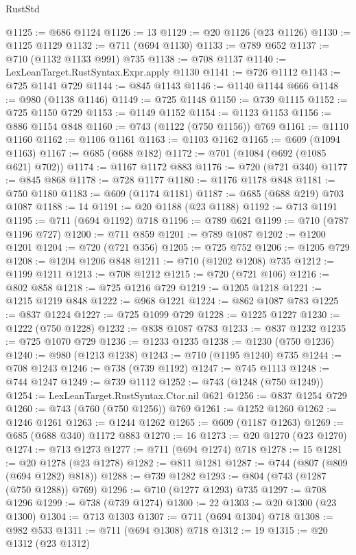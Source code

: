 \begin{lexlean}{RustStd}
\begin{coremodule}
@1125 := @686 @1124
@1126 := 13
@1129 := @20 @1126 (@23 @1126)
@1130 := @1125 @1129
@1132 := @711 (@694 @1130)
@1133 := @789 @652
@1137 := @710 (@1132 @1133 @991) @735
@1138 := @708 @1137
@1140 := LexLeanTarget.RustSyntax.Expr.apply @1130
@1141 := @726 @1112
@1143 := @725 @1141 @729
@1144 := @845 @1143
@1146 := @1140 @1144 @666
@1148 := @980 (@1138 @1146)
@1149 := @725 @1148
@1150 := @739 @1115
@1152 := @725 @1150 @729
@1153 := @1149 @1152
@1154 := @1123 @1153
@1156 := @886 @1154 @848
@1160 := @743 (@1122 (@750 @1156)) @769
@1161 := @1110 @1160
@1162 := @1106 @1161
@1163 := @1103 @1162
@1165 := @609 (@1094 @1163)
@1167 := @685 (@688 @182)
@1172 := @701 (@1084 (@692 (@1085 @621) @702))
@1174 := @1167 @1172 @883
@1176 := @720 (@721 @340)
@1177 := @845 @868
@1178 := @728 @1177
@1180 := @1176 @1178 @848
@1181 := @750 @1180
@1183 := @609 (@1174 @1181)
@1187 := @685 (@688 @219) @703 @1087
@1188 := 14
@1191 := @20 @1188 (@23 @1188)
@1192 := @713 @1191
@1195 := @711 (@694 @1192) @718
@1196 := @789 @621
@1199 := @710 (@787 @1196 @727)
@1200 := @711 @859
@1201 := @789 @1087
@1202 := @1200 @1201
@1204 := @720 (@721 @356)
@1205 := @725 @752
@1206 := @1205 @729
@1208 := @1204 @1206 @848
@1211 := @710 (@1202 @1208) @735
@1212 := @1199 @1211
@1213 := @708 @1212
@1215 := @720 (@721 @106)
@1216 := @802 @858
@1218 := @725 @1216 @729
@1219 := @1205 @1218
@1221 := @1215 @1219 @848
@1222 := @968 @1221
@1224 := @862 @1087 @783
@1225 := @837 @1224
@1227 := @725 @1099 @729
@1228 := @1225 @1227
@1230 := @1222 (@750 @1228)
@1232 := @838 @1087 @783
@1233 := @837 @1232
@1235 := @725 @1070 @729
@1236 := @1233 @1235
@1238 := @1230 (@750 @1236)
@1240 := @980 (@1213 @1238)
@1243 := @710 (@1195 @1240) @735
@1244 := @708 @1243
@1246 := @738 (@739 @1192)
@1247 := @745 @1113
@1248 := @744 @1247
@1249 := @739 @1112
@1252 := @743 (@1248 (@750 @1249))
@1254 := LexLeanTarget.RustSyntax.Ctor.nil @621
@1256 := @837 @1254 @729
@1260 := @743 (@760 (@750 @1256)) @769
@1261 := @1252 @1260
@1262 := @1246 @1261
@1263 := @1244 @1262
@1265 := @609 (@1187 @1263)
@1269 := @685 (@688 @340) @1172 @883
@1270 := 16
@1273 := @20 @1270 (@23 @1270)
@1274 := @713 @1273
@1277 := @711 (@694 @1274) @718
@1278 := 15
@1281 := @20 @1278 (@23 @1278)
@1282 := @811 @1281
@1287 := @744 (@807 (@809 (@694 @1282) @818))
@1288 := @739 @1282
@1293 := @804 (@743 (@1287 (@750 @1288)) @769)
@1296 := @710 (@1277 @1293) @735
@1297 := @708 @1296
@1299 := @738 (@739 @1274)
@1300 := 22
@1303 := @20 @1300 (@23 @1300)
@1304 := @713 @1303
@1307 := @711 (@694 @1304) @718
@1308 := @982 @533
@1311 := @711 (@694 @1308) @718
@1312 := 19
@1315 := @20 @1312 (@23 @1312)

\end{coremodule}
\end{lexlean}
